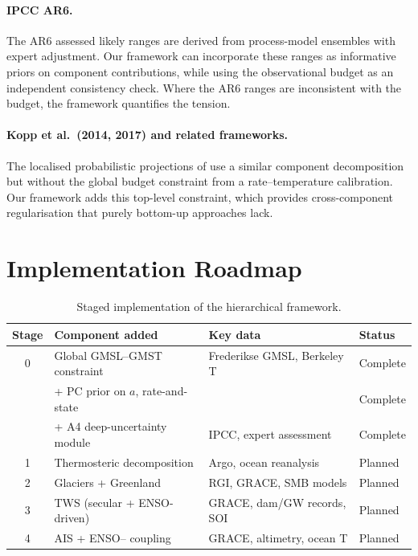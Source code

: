 \documentclass[11pt]{article}
\newcommand{\CDW}{\text{CDW}}
\begin{document}
\paragraph{IPCC AR6.}  The AR6 assessed likely ranges are derived from process-model ensembles with expert adjustment.  Our framework can incorporate these ranges as informative priors on component contributions, while using the observational budget as an independent consistency check.  Where the AR6 ranges are inconsistent with the budget, the framework quantifies the tension.

\paragraph{Kopp et al.\ (2014, 2017) and related frameworks.}  The localised probabilistic projections of \citet{kopp2014probabilistic} use a similar component decomposition but without the global budget constraint from a rate--temperature calibration.  Our framework adds this top-level constraint, which provides cross-component regularisation that purely bottom-up approaches lack.


\section{Implementation Roadmap}
\label{sec:roadmap}

\begin{table}[ht]
\centering
\caption{Staged implementation of the hierarchical framework.}
\label{tab:roadmap}
\begin{tabular}{clll}
\toprule
Stage & Component added & Key data & Status \\
\midrule
0 & Global GMSL--GMST constraint & Frederikse GMSL, Berkeley T & Complete \\
  & \quad + PC prior on $a$, rate-and-state & & Complete \\
  & \quad + A4 deep-uncertainty module & IPCC, expert assessment & Complete \\
1 & Thermosteric decomposition & Argo, ocean reanalysis & Planned \\
2 & Glaciers + Greenland & RGI, GRACE, SMB models & Planned \\
3 & TWS (secular + ENSO-driven) & GRACE, dam/GW records, SOI & Planned \\
4 & AIS + ENSO--\CDW{} coupling & GRACE, altimetry, ocean T & Planned \\
\bottomrule
\end{tabular}
\end{table}
\end{document}
